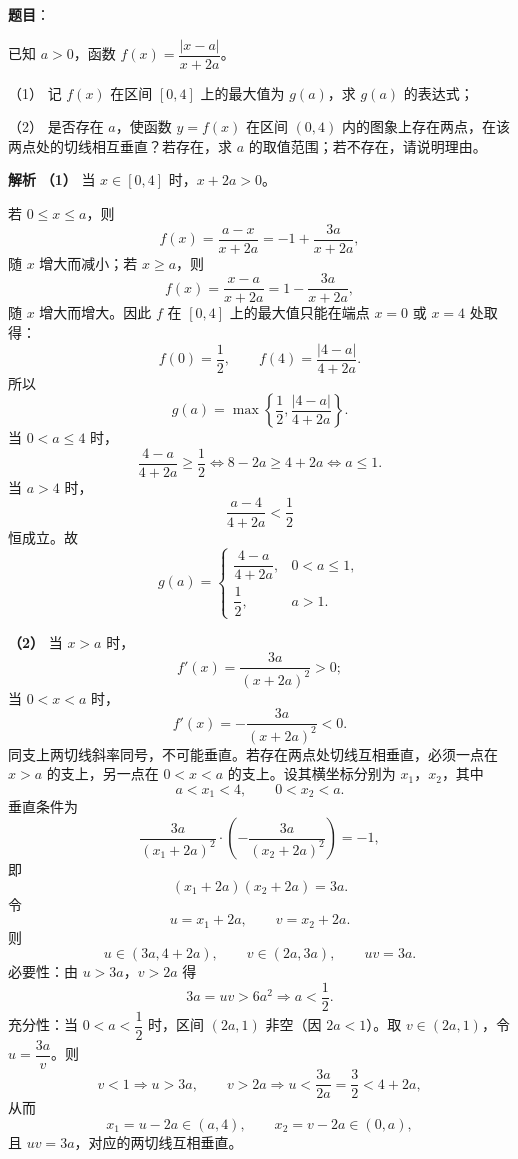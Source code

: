 \begin{answer}

\textbf{题目}：

已知 $a>0$，函数 $f(x)=\dfrac{|x-a|}{x+2a}$。

（1） 记 $f(x)$ 在区间 $[0,4]$ 上的最大值为 $g(a)$，求 $g(a)$ 的表达式；

（2） 是否存在 $a$，使函数 $y=f(x)$ 在区间 $(0,4)$ 内的图象上存在两点，在该两点处的切线相互垂直？若存在，求 $a$ 的取值范围；若不存在，请说明理由。

\textbf{解析}
\textbf{（1）} 当 $x\in[0,4]$ 时，$x+2a>0$。

若 $0\leqslant x\leqslant a$，则
\nopagebreak[4]
\[f(x)=\frac{a-x}{x+2a}=-1+\frac{3a}{x+2a},\]
随 $x$ 增大而减小；若 $x\geqslant a$，则
\nopagebreak[4]
\[f(x)=\frac{x-a}{x+2a}=1-\frac{3a}{x+2a},\]
随 $x$ 增大而增大。因此 $f$ 在 $[0,4]$ 上的最大值只能在端点 $x=0$ 或 $x=4$ 处取得：
\nopagebreak[4]
\[f(0)=\frac12,\qquad
f(4)=\frac{|4-a|}{4+2a}.\]
所以
\nopagebreak[4]
\[g(a)=\max\left\{\frac12,\frac{|4-a|}{4+2a}\right\}.\]
当 $0<a\leqslant4$ 时，
\nopagebreak[4]
\[\frac{4-a}{4+2a}\geqslant\frac12
\Longleftrightarrow 8-2a\geqslant4+2a
\Longleftrightarrow a\leqslant1.\]
当 $a>4$ 时，
\nopagebreak[4]
\[\frac{a-4}{4+2a}<\frac12\]
恒成立。故
\nopagebreak[4]
\[g(a)=\begin{cases}
\dfrac{4-a}{4+2a},&0<a\leqslant1,\\[2mm]
\dfrac12,&a>1.
\end{cases}\]

\textbf{（2）} 当 $x>a$ 时，
\nopagebreak[4]
\[f'(x)=\frac{3a}{(x+2a)^2}>0;\]
当 $0<x<a$ 时，
\nopagebreak[4]
\[f'(x)=-\frac{3a}{(x+2a)^2}<0.\]
同支上两切线斜率同号，不可能垂直。若存在两点处切线互相垂直，必须一点在 $x>a$ 的支上，另一点在 $0<x<a$ 的支上。设其横坐标分别为 $x_1$，$x_2$，其中
\nopagebreak[4]
\[a<x_1<4,\qquad 0<x_2<a.\]
垂直条件为
\nopagebreak[4]
\[\frac{3a}{(x_1+2a)^2}\cdot\left(-\frac{3a}{(x_2+2a)^2}\right)=-1,\]
即
\nopagebreak[4]
\[(x_1+2a)(x_2+2a)=3a.\]
令
\nopagebreak[4]
\[u=x_1+2a,\qquad v=x_2+2a.\]
则
\nopagebreak[4]
\[u\in(3a,4+2a),\qquad v\in(2a,3a),\qquad uv=3a.\]
必要性：由 $u>3a$，$v>2a$ 得
\nopagebreak[4]
\[3a=uv>6a^2\Longrightarrow a<\frac12.\]
充分性：当 $0<a<\dfrac12$ 时，区间 $\left(2a,1\right)$ 非空（因 $2a<1$）。取 $v\in(2a,1)$，令 $u=\dfrac{3a}{v}$。则
\nopagebreak[4]
\[v<1\Longrightarrow u>3a,\qquad
v>2a\Longrightarrow u<\frac{3a}{2a}=\frac32<4+2a,\]
从而
\nopagebreak[4]
\[x_1=u-2a\in(a,4),\qquad x_2=v-2a\in(0,a),\]
且 $uv=3a$，对应的两切线互相垂直。


\end{answer}
